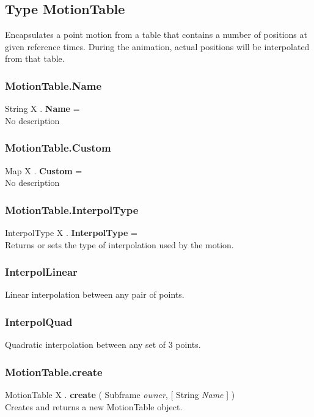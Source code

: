 \subsection{Type MotionTable \label{T:MotionTable}}
Encapsulates a point motion from a table that contains a number of positions at given reference times. During the animation, actual positions will be interpolated from that table.

\subsubsection{MotionTable.Name \label{F:MotionTable:Name}}
String X . \textbf{Name} = \\
No description

\subsubsection{MotionTable.Custom \label{F:MotionTable:Custom}}
Map X . \textbf{Custom} = \\
No description

\subsubsection{MotionTable.InterpolType \label{F:MotionTable:InterpolType}}
InterpolType X . \textbf{InterpolType} = \\
Returns or sets the type of interpolation used by the motion.

\subsubsection{InterpolLinear \label{T:InterpolType|InterpolLinear}}
Linear interpolation between any pair of points.

\subsubsection{InterpolQuad \label{T:InterpolType|InterpolQuad}}
Quadratic interpolation between any set of 3 points.

\subsubsection{MotionTable.create \label{F:MotionTable:create}}
MotionTable X . \textbf{create} ( Subframe \textit{owner},  [ String \textit{Name} ] ) \\
Creates and returns a new MotionTable object.

